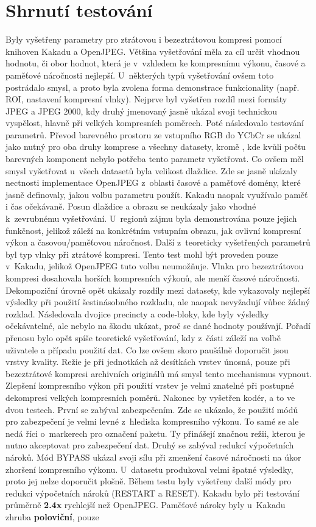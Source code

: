 \section{Shrnutí testování}
Byly vyšetřeny parametry pro ztrátovou i bezeztrátovou kompresi pomocí knihoven Kakadu a OpenJPEG. Většina vyšetřování měla za cíl určit vhodnou hodnotu, či obor hodnot, která je v~vzhledem ke kompresnímu výkonu, časové a paměťové náročnosti nejlepší. U~některých typů vyšetřování ovšem toto postrádalo smysl, a proto byla zvolena forma demonstrace funkcionality (např. ROI, nastavení kompresní vlnky). Nejprve byl vyšetřen rozdíl mezi formáty JPEG a JPEG 2000, kdy druhý jmenovaný jasně ukázal svoji technickou vyspělost, hlavně při velkých kompresních poměrech. Poté následovalo testování parametrů. Převod barevného prostoru ze vstupního RGB do YCbCr se ukázal jako nutný pro oba druhy komprese a všechny datasety, kromě , kde kvůli počtu barevných komponent nebylo potřeba tento parametr vyšetřovat. Co ovšem měl smysl vyšetřovat u~všech datasetů byla velikost dlaždice. Zde se jasně ukázaly nectnosti implementace OpenJPEG z~oblasti časové a paměťové domény, které jasně definovaly, jakou volbu parametru použít. Kakadu naopak využívalo paměť i čas očekávaně. Posun dlaždice a obrazu se neukázaly jako vhodné k~zevrubnému vyšetřování. U~regionů zájmu byla demonstrována pouze jejich funkčnost, jelikož záleží na konkrétním vstupním obrazu, jak ovlivní kompresní výkon a časovou/paměťovou náročnost. Další z~teoreticky vyšetřených parametrů byl typ vlnky při ztrátové kompresi. Tento test mohl být proveden pouze v~Kakadu, jelikož OpenJPEG tuto volbu neumožňuje. Vlnka pro bezeztrátovou kompresi dosahovala horších kompresních výkonů, ale menší časové náročnosti. Dekompoziční úrovně opět ukázaly rozdíly mezi datasety, kde  vykazovaly nejlepší výsledky při použití šestinásobného rozkladu, ale  naopak nevyžadují vůbec žádný rozklad. Následovala dvojice precincty a code-bloky, kde byly výsledky očekávatelné, ale nebylo na škodu ukázat, proč se dané hodnoty používají. Pořadí přenosu bylo opět spíše teoretické vyšetřování, kdy z~části záleží na volbě uživatele a případu použití dat. Co lze ovšem skoro paušálně doporučit jsou vrstvy kvality. Režie je při jednotkách až desítkách vrstev únosná, pouze při bezeztrátové kompresi archivních originálů má smysl tento mechanismus vypnout. Zlepšení kompresního výkon při použití vrstev je velmi znatelné při postupné dekompresi velkých kompresních poměrů. Nakonec by vyšetřen kodér, a to ve dvou testech. První se zabýval zabezpečením. Zde se ukázalo, že použití módů pro zabezpečení je velmi levné z~hlediska kompresního výkonu. To samé se ale nedá říci o~markerech pro označení paketu. Ty přinášejí značnou režii, kterou je nutno akceptovat pro zabezpečení dat. Druhý se zabýval redukcí výpočetních nároků. Mód BYPASS ukázal svoji sílu při zmenšení časové náročnosti na úkor zhoršení kompresního výkonu. U~datasetu  produkoval velmi špatné výsledky, proto jej nelze doporučit plošně. Během testu byly vyšetřeny další módy pro redukci výpočetních nároků (RESTART a RESET). Kakadu bylo při testování průměrně \textbf{2.4x} rychlejší než OpenJPEG. Paměťové nároky byly u~Kakadu zhruba \textbf{poloviční}, pouze 